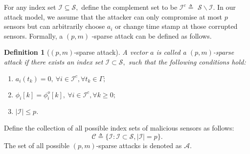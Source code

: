 \documentclass[12pt]{article}
\newcommand{\Rb}{{\mathbb{R}}}
\newcommand{\Cc}{{\mathcal{C}}}
\newcommand{\I}{{\mathcal{I}}}
\newcommand{\Ss}{{\mathscr{S}}}
\newcommand{\tgm}{\tilde{\Gamma}}
\newcommand{\gm}{{\Gamma}}
\newtheorem{definition}{\textbf{Definition}}
\begin{document}
For any index set $\I \subseteq \Ss,$ define the complement set to be $\I^{c} \triangleq$ $\Ss \backslash \I$. 
In our attack model, we assume that the attacker can only compromise at most $p$ sensors but can arbitrarily choose $a_{i}$ or change time stamp at those corrupted sensors. Formally, a $(p, m)$ -sparse attack can be defined as follows. 
\begin{definition}[$(p, m)$-sparse attack]
	A vector $a$ is called a $(p, m)$-sparse attack if there exists an index set $\I \subset \Ss,$ such that the following conditions hold:
	\begin{enumerate}
		\item $a_{i}(t_k)=0 ,\ \forall i \in \I^{c}, \forall t_k\in\Gamma ;$
		\item $\phi_i[k]=\phi^o_i[k], \ \forall i \in \I^{c}, \forall k\geq0 ;$
		\item $|\I| \leq p$. 
	\end{enumerate}
	
\end{definition}
Define the collection of all possible index sets of malicious sensors as follows:
$$
\Cc \triangleq\{\I: \I \subset \Ss,|\I|=p\}.
$$
The set of all possible $(p, m)$-sparse attacks is denoted as $\mathcal{A}$.

%
\end{document}
